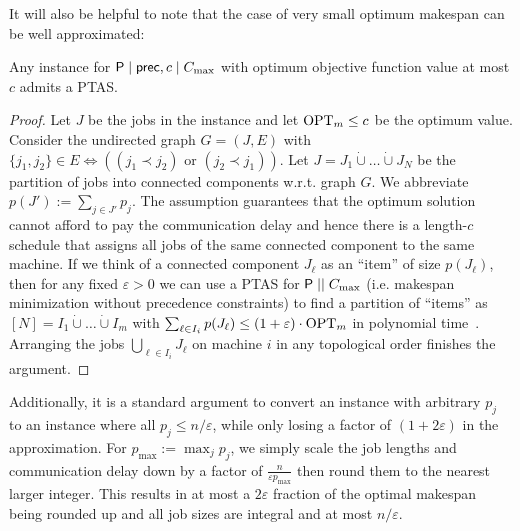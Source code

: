       
 It will also be helpful to note that the case of very small optimum makespan can be well approximated:      
\begin{lemma} \label{lem:PTASForProblemifOPTatMostC}
  Any instance for $\mathsf{P} \mid \mathsf{prec}, c \mid C_{\max}$ with optimum objective function value at most $c$
  admits a PTAS.
\end{lemma}
\begin{proof}
  Let $J$ be the jobs in the instance and let $\textnormal{OPT}_m \leq c$ be the optimum value.
  Consider the undirected graph $G = (J,E)$ with $\{ j_1,j_2 \} \in E \Leftrightarrow (( j_1 \prec j_2)\textrm{ or }(j_2 \prec j_1))$.
  Let $J = J_1 \dot{\cup} \ldots \dot{\cup} J_N$ be the partition of jobs into connected components w.r.t. graph $G$.
  We abbreviate $p(J') := \sum_{j \in J'} p_j$. The assumption guarantees that the optimum solution cannot afford to pay the communication delay
  and hence there is a length-$c$ schedule that assigns all jobs of the same connected component to the same machine. If we think of a connected component $J_{\ell}$
  as an ``item'' of size $p(J_{\ell})$, then for any fixed $\varepsilon>0$ we can use a PTAS for $\mathsf{P} \mid  \mid C_{\max}$ (i.e. makespan minimization without
  precedence constraints) to find a partition of ``items'' as $[N] = I_1 \dot{\cup} \ldots \dot{\cup} I_m$ with $\sum_{\ell \in I_i} p(J_{\ell}) \leq (1+\varepsilon) \cdot \textnormal{OPT}_m$ in polynomial time~\cite{ApproxAlgoForSchedulingHochbaumShmoysJACM87}. 
  Arranging the jobs $\bigcup_{\ell \in I_i} J_{\ell}$ on machine $i$ in any topological order finishes the argument.
\end{proof}


Additionally, it is a standard argument to convert an instance with arbitrary $p_j$ to an instance where all $p_j \leq n / \varepsilon$,
while only losing a factor of $(1+2\varepsilon)$ in the approximation. 
For $p_{\textrm{max}}:=\max_j p_j$, we simply scale the job lengths and communication delay down by a factor of $\frac{n }{ \varepsilon p_{\textrm{max}}}$
then round them to the nearest larger integer.
This results in at most a $2 \varepsilon$ fraction of the optimal makespan being rounded up and all 
job sizes are integral and at most $n / \varepsilon$. 

